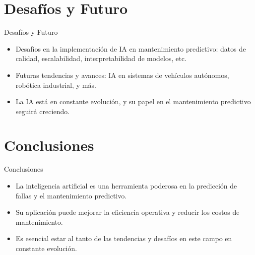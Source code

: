 \documentclass{beamer}
\begin{document}
\section{Desafíos y Futuro}
\begin{frame}{Desafíos y Futuro}
  \begin{itemize}
 \item Desafíos en la implementación de IA en mantenimiento predictivo: datos de calidad, escalabilidad, interpretabilidad de modelos, etc.
    \item Futuras tendencias y avances: IA en sistemas de vehículos autónomos, robótica industrial, y más.
    \item La IA está en constante evolución, y su papel en el mantenimiento predictivo seguirá creciendo.
  \end{itemize}
\end{frame}

\section{Conclusiones}
\begin{frame}{Conclusiones}
  \begin{itemize}
    \item La inteligencia artificial es una herramienta poderosa en la predicción de fallas y el mantenimiento predictivo.
    \item Su aplicación puede mejorar la eficiencia operativa y reducir los costos de mantenimiento.
    \item Es esencial estar al tanto de las tendencias y desafíos en este campo en constante evolución.
  \end{itemize}
\end{frame}
\end{document}
